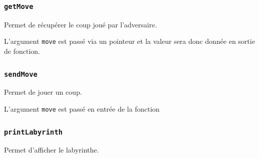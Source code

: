 \documentclass[french,12pt,a4paper,twoside,openright,titlepage]{report}
\begin{document}
\subsubsection{\texttt{getMove}}
Permet de récupérer le coup joué par l'adversaire.

L'argument \texttt{move} est passé via un pointeur et 
la valeur sera donc donnée en sortie de fonction.


\subsubsection{\texttt{sendMove}}
Permet de jouer un coup.

L'argument \texttt{move} est passé en entrée de la fonction

\subsubsection{\texttt{printLabyrinth}}
Permet d'afficher le labyrinthe.

\end{document}
